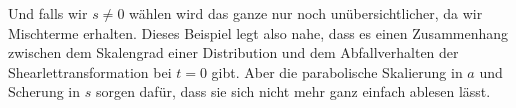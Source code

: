 Und falls wir $s \neq 0$ wählen wird das ganze nur noch unübersichtlicher, da wir Mischterme erhalten. Dieses Beispiel legt also nahe, dass es einen Zusammenhang zwischen dem Skalengrad einer Distribution und dem Abfallverhalten der Shearlettransformation bei $t=0$ gibt. Aber die parabolische Skalierung in $a$ und Scherung in $s$ sorgen dafür, dass sie sich nicht mehr ganz einfach ablesen lässt.

